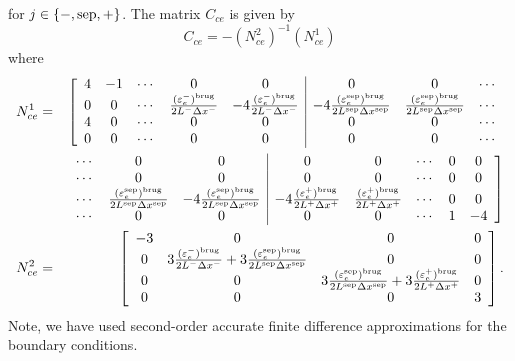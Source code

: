 \documentclass[12pt]{article}
\newcommand{\brug}{\text{brug}}
\providecommand{\sep}{\ensuremath{\rm{sep}}}
\begin{document}
for $j \in \{-,\sep,+\}$. The matrix $C_{ce}$ is given by
\begin{equation}
	C_{ce} = -(N^2_{ce})^{-1}(N^1_{ce})
\end{equation}
where
\begin{eqnarray}
	N^1_{ce} &=& 
        \left[
        \begin{array}{ccccc|ccc}
         4 & -1 & \cdots & 0 & 0 & 0 & 0 & \cdots \\
         0 & 0 & \cdots & \frac{(\varepsilon_e^-)^{\brug}}{2L^- \Delta x^-} & -4 \frac{(\varepsilon_e^-)^{\brug}}{2L^- \Delta x^-} & -4 \frac{(\varepsilon_e^{\sep})^{\brug}}{2L^{\sep} \Delta x^{\sep}} &  \frac{(\varepsilon_e^{\sep})^{\brug}}{2L^{\sep} \Delta x^{\sep}} & \cdots \\
         4 & 0 & \cdots & 0 & 0 & 0 & 0 & \cdots \\
         0 & 0 & \cdots & 0 & 0 & 0 & 0 & \cdots 
        \end{array}
        \right. \nonumber \\
        && \left.
        \begin{array}{ccc|ccccc}
        \cdots & 0 & 0 & 0 & 0 & \cdots & 0 & 0 \\
        \cdots & 0 & 0 & 0 & 0 & \cdots & 0 & 0 \\
        \cdots & \frac{(\varepsilon_e^{\sep})^{\brug}}{2L^{\sep} \Delta x^{\sep}} & -4 \frac{(\varepsilon_e^{\sep})^{\brug}}{2L^{\sep} \Delta x^{\sep}} & -4 \frac{(\varepsilon_e^{+})^{\brug}}{2L^{+} \Delta x^{+}} & \frac{(\varepsilon_e^{+})^{\brug}}{2L^{+} \Delta x^{+}} & \cdots & 0 & 0 \\
        \cdots & 0 & 0 & 0 & 0 & \cdots & 1 & -4
        \end{array}
        \right] \\
	N^2_{ce} &=& 
        \left[
        \begin{array}{cccc}
        -3  &  0 & 0 & 0 \\
         0  &  3\frac{(\varepsilon_e^-)^{\brug}}{2L^- \Delta x^-} + 3 \frac{(\varepsilon_e^{\sep})^{\brug}}{2L^{\sep} \Delta x^{\sep}} & 0 & 0 \\
         0 & 0  & 3 \frac{(\varepsilon_e^{\sep})^{\brug}}{2L^{\sep} \Delta x^{\sep}} + 3\frac{(\varepsilon_e^+)^{\brug}}{2L^+ \Delta x^+}& 0 \\
        0 & 0  & 0 & 3 
        \end{array}
        \right].
\end{eqnarray}
Note, we have used second-order accurate finite difference approximations for the boundary conditions.
\end{document}
